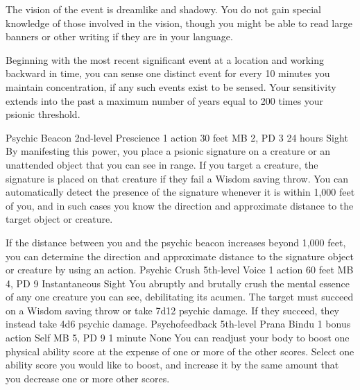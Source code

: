 The vision of the event is dreamlike and shadowy. You do not
gain special knowledge of those involved in the vision, though
you might be able to read large banners or other writing if
they are in your language.

Beginning with the most recent significant event at a location
and working backward in time, you can sense one distinct event
for every 10 minutes you maintain concentration, if any such
events exist to be sensed. Your sensitivity extends into the
past a maximum number of years equal to 200 times your psionic
threshold.

\DndPowerHeader%
    {Psychic Beacon\label{pwr:psychic-beacon}}
    {2nd-level Prescience}
    {1 action}
    {30 feet}
    {MB 2, PD 3}
    {24 hours}
    {Sight}
By manifesting this power, you place a psionic signature on a creature
or an unattended object that you can see in range.
If you target a creature, the signature is placed on that creature
if they fail a Wisdom saving throw.
You can automatically detect the presence of the signature
whenever it is within 1,000 feet of you,
and in such cases you know the direction and approximate distance
to the target object or creature.

If the distance between you and the psychic beacon
increases beyond 1,000 feet, you can determine the direction
and approximate distance to the signature object or creature
by using an action.
\DndPowerHeader%
    {Psychic Crush\label{pwr:psychic-crush}}
    {5th-level Voice}
    {1 action}
    {60 feet}
    {MB 4, PD 9}
    {Instantaneous}
    {Sight}
You abruptly and brutally crush
the mental essence of any one creature you can see, debilitating
its acumen. The target must succeed on a Wisdom saving throw
or take 7d12 psychic damage. If they succeed, they instead
take 4d6 psychic damage.
\DndPowerHeader%
    {Psychofeedback\label{pwr:psychofeedback}}
    {5th-level Prana Bindu}
    {1 bonus action}
    {Self}
    {MB 5, PD 9}
    {1 minute}
    {None}
You can readjust your body to boost one physical
ability score at the expense of one or more of the other scores.
Select one ability score you would like to boost, and increase
it by the same amount that you decrease one or more other
scores.

